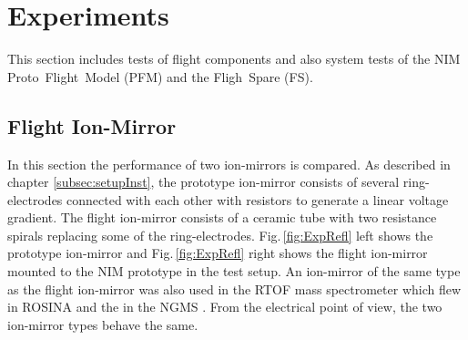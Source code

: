 \section{Experiments} \label{sec:Exp}
	
	This section includes tests of flight components and also system tests of the NIM Proto~Flight~Model (PFM) and the Fligh~Spare (FS).


	\subsection{Flight Ion-Mirror }
	In this section the performance of two ion-mirrors is compared. As described in chapter \ref{subsec:setupInst}, the prototype ion-mirror consists of several ring-electrodes connected with each other with resistors to generate a linear voltage gradient. The flight ion-mirror consists of a ceramic tube with two resistance spirals replacing some of the ring-electrodes. Fig.\,\ref{fig:ExpRefl} left shows the prototype ion-mirror and Fig.\,\ref{fig:ExpRefl} right shows the flight ion-mirror mounted to the NIM prototype in the test setup. An ion-mirror of the same type as the flight ion-mirror was also used in the RTOF mass spectrometer which flew in ROSINA \cite{Diss_Scherer} and the in the NGMS \cite{Diss_Hofer}. From the electrical point of view, the two ion-mirror types behave the same.\\

